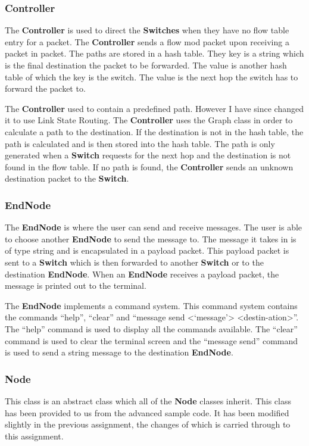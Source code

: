 \documentclass{article}
\begin{document}
\subsubsection{Controller}
The \textbf{Controller} is used to direct the \textbf{Switches} when they have
no flow table entry for a packet. The \textbf{Controller} sends a flow mod
packet upon receiving a packet in packet. The paths are stored in a hash table.
They key is a string which is the final destination the packet to be forwarded.
The value is another hash table of which the key is the switch. The value is the
next hop the switch has to forward the packet to.

The \textbf{Controller} used to contain a predefined path. However I have since
changed it to use Link State Routing. The \textbf{Controller} uses the Graph
class in order to calculate a path to the destination. If the destination is not
in the hash table, the path is calculated and is then stored into the hash table.
The path is only generated when a \textbf{Switch} requests for the next hop and
the destination is not found in the flow table. If no path is found, the
\textbf{Controller} sends an unknown destination packet to the \textbf{Switch}.

\subsubsection{EndNode}
The \textbf{EndNode} is where the user can send and receive messages. The user
is able to choose another \textbf{EndNode} to send the message to. The message
it takes in is of type string and is encapsulated in a payload packet. This
payload packet is sent to a \textbf{Switch} which is then forwarded to another
\textbf{Switch} or to the destination \textbf{EndNode}. When an \textbf{EndNode}
receives a payload packet, the message is printed out to the terminal.

The \textbf{EndNode} implements a command system. This command system contains
the commands ``help'', ``clear'' and ``message send
\textless`message'\textgreater
\textless{}destin-\newline{}ation\textgreater{}''. The ``help'' command is used
to display all the commands available. The ``clear'' command is used to clear the
terminal screen and the ``message send'' command is used to send a string
message to the destination \textbf{EndNode}.

\subsubsection{Node}
This class is an abstract class which all of the \textbf{Node} classes inherit.
This class has been provided to us from the advanced sample code. It has been
modified slightly in the previous assignment, the changes of which is carried
through to this assignment.
\end{document}
